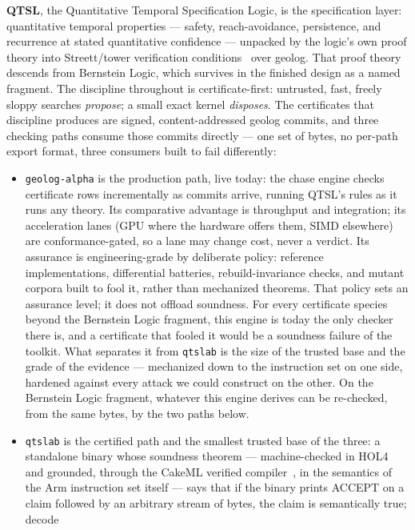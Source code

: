 \textbf{QTSL}, the Quantitative Temporal Specification Logic, is the
specification layer: quantitative temporal properties --- safety,
reach-avoidance, persistence, and recurrence at stated quantitative
confidence --- unpacked by the logic's own proof theory into
Streett/tower verification conditions~\cite{abate24,abate26a} over
geolog. That proof theory
descends from Bernstein Logic, which survives in the finished design
as a named fragment. The discipline throughout is certificate-first:
untrusted, fast, freely sloppy searches \emph{propose}; a small exact
kernel \emph{disposes}. The certificates that discipline produces are
signed, content-addressed geolog commits, and three checking paths
consume those commits directly --- one set of bytes, no per-path
export format, three consumers built to fail differently:
\begin{itemize}
\item \texttt{geolog-alpha} is the production path, live today: the
  chase engine checks certificate rows incrementally as commits
  arrive, running QTSL's rules as it runs any theory. Its comparative
  advantage is throughput and integration; its acceleration lanes
  (GPU where the hardware offers them, SIMD elsewhere) are
  conformance-gated, so a lane may change cost, never a verdict. Its
  assurance is engineering-grade by deliberate policy: reference
  implementations, differential batteries, rebuild-invariance checks,
  and mutant corpora built to fool it, rather than mechanized
  theorems. That policy sets an assurance level; it does not offload
  soundness. For every certificate species beyond the Bernstein Logic
  fragment, this engine is today the only checker there is, and a
  certificate that fooled it would be a soundness failure of the
  toolkit. What separates it from \texttt{qtslab} is the size of the
  trusted base and the grade of the evidence --- mechanized down to
  the instruction set on one side, hardened against every attack we
  could construct on the other. On the Bernstein Logic fragment,
  whatever this engine derives can be re-checked, from the same
  bytes, by the two paths below.
\item \texttt{qtslab} is the certified path and the smallest trusted
  base of the three: a standalone binary whose soundness theorem ---
  machine-checked in HOL4 and grounded, through the CakeML verified
  compiler~\cite{kumar14cakeml}, in the semantics of the Arm
  instruction set itself ---
  says that if the binary prints ACCEPT on a claim followed by an
  arbitrary stream of bytes, the claim is semantically true; decode

\end{itemize}
